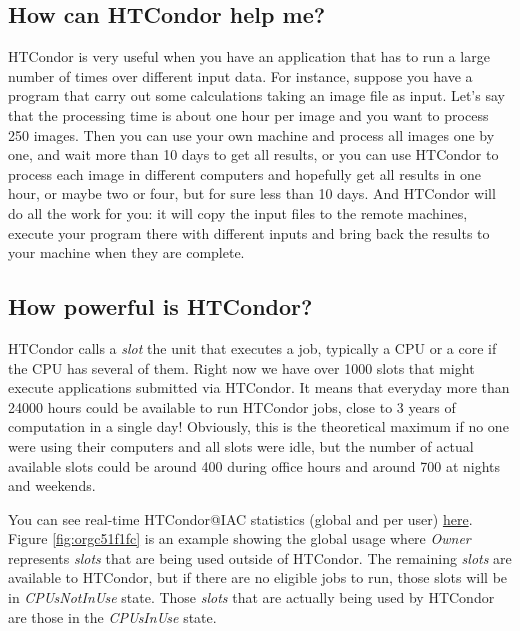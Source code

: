 \documentclass[a4paper,10pt]{article}
\begin{document}
\subsection{How can HTCondor help me?}
\label{sec:orgdbc5ab3}

HTCondor is very useful when you have an application that has to run a large
number of times over different input data. For instance, suppose you have a
program that carry out some calculations taking an image file as input. Let's
say that the processing time is about one hour per image and you want to process
250 images. Then you can use your own machine and process all images one by one,
and wait more than 10 days to get all results, or you can use HTCondor to
process each image in different computers and hopefully get all results in one
hour, or maybe two or four, but for sure less than 10 days. And HTCondor will do
all the work for you: it will copy the input files to the remote machines,
execute your program there with different inputs and bring back the results to
your machine when they are complete.

\subsection{How \textbf{powerful} is HTCondor?}
\label{sec:orgb2ce4de}

HTCondor calls a \emph{slot} the unit that executes a job, typically a CPU or a core
if the CPU has several of them. Right now we have over 1000 slots that might
execute applications submitted via HTCondor. It means that everyday more than
24000 hours could be available to run HTCondor jobs, close to 3 years of
computation in a single day! Obviously, this is the theoretical maximum if no
one were using their computers and all slots were idle, but the number of actual
available slots could be around 400 during office hours and around 700 at nights
and weekends.

You can see real-time HTCondor@IAC statistics (global and per user) \href{http://pasa/ganglia/?r=week\&cs=\&ce=\&m=load\_one\&tab=v\&vn=pool\_usage\&hide-hf=false}{here}. Figure
\ref{fig:orgc51f1fc} is an example showing the global usage where \emph{Owner} represents
\emph{slots} that are being used outside of HTCondor. The remaining \emph{slots} are
available to HTCondor, but if there are no eligible jobs to run, those slots
will be in \emph{CPUsNotInUse} state. Those \emph{slots} that are actually being used by
HTCondor are those in the \emph{CPUsInUse} state.
\end{document}
